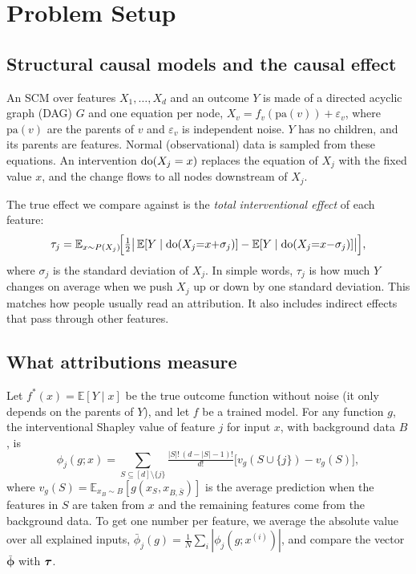 \section{Problem Setup}
\subsection{Structural causal models and the causal effect}
An SCM over features $X_1,\dots,X_d$ and an outcome $Y$ is made of a directed acyclic graph (DAG) $G$ and one equation per node, $X_v = f_v(\mathrm{pa}(v)) + \varepsilon_v$, where $\mathrm{pa}(v)$ are the parents of $v$ and $\varepsilon_v$ is independent noise. $Y$ has no children, and its parents are features. Normal (observational) data is sampled from these equations. An intervention $\operatorname{do}(X_j = x)$ replaces the equation of $X_j$ with the fixed value $x$, and the change flows to all nodes downstream of $X_j$.

The true effect we compare against is the \emph{total interventional effect} of each feature:
\begin{equation}
\tau_j = \mathbb{E}_{x \sim P(X_j)}\!\Big[\tfrac12\big|\,\mathbb{E}[Y \mid \operatorname{do}(X_j{=}x{+}\sigma_j)] - \mathbb{E}[Y \mid \operatorname{do}(X_j{=}x{-}\sigma_j)]\big|\Big],
\label{eq:tau}
\end{equation}
where $\sigma_j$ is the standard deviation of $X_j$. In simple words, $\tau_j$ is how much $Y$ changes on average when we push $X_j$ up or down by one standard deviation. This matches how people usually read an attribution. It also includes indirect effects that pass through other features.

\subsection{What attributions measure}
Let $f^*(x) = \mathbb{E}[Y \mid x]$ be the true outcome function without noise (it only depends on the parents of $Y$), and let $f$ be a trained model. For any function $g$, the interventional Shapley value of feature $j$ for input $x$, with background data $B$, is
\begin{equation}
\phi_j(g; x) = \!\!\sum_{S \subseteq [d]\setminus\{j\}}\!\! \tfrac{|S|!\,(d-|S|-1)!}{d!}\big[v_g(S\cup\{j\}) - v_g(S)\big],
\end{equation}
where $v_g(S) = \mathbb{E}_{x_B \sim B}[g(x_S, x_{B,\bar S})]$ is the average prediction when the features in $S$ are taken from $x$ and the remaining features come from the background data. To get one number per feature, we average the absolute value over all explained inputs, $\bar\phi_j(g) = \frac1N\sum_i |\phi_j(g; x^{(i)})|$, and compare the vector $\bar{\boldsymbol\phi}$ with $\boldsymbol{\tau}$.

